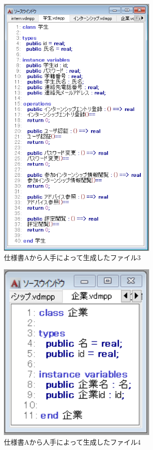 \begin{figure}[tp]
    \begin{center}
    \includegraphics[width=300]{image/speA_vdm3.PNG}
    \caption{仕様書Aから人手によって生成したファイル3}
    \label{fig:speA_vdm3}
    \end{center}
\end{figure}

\begin{figure}[tp]
    \begin{center}
    \includegraphics[width=300]{image/speA_vdm4.PNG}
    \caption{仕様書Aから人手によって生成したファイル4}
    \label{fig:speA_vdm4}
    \end{center}
\end{figure}

